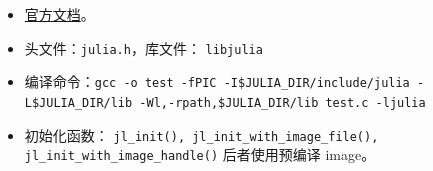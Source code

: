 
\begin{itemize}
\item \href{https://docs.julialang.org/en/v1/manual/embedding/}{官方文档}。
\item 头文件：\verb`julia.h`，库文件： \verb`libjulia`
\item 编译命令：\verb`gcc -o test -fPIC -I$JULIA_DIR/include/julia -L$JULIA_DIR/lib -Wl,-rpath,$JULIA_DIR/lib test.c -ljulia`
\item 初始化函数： \verb`jl_init(), jl_init_with_image_file(), jl_init_with_image_handle()` 后者使用预编译 image。
\end{itemize}
